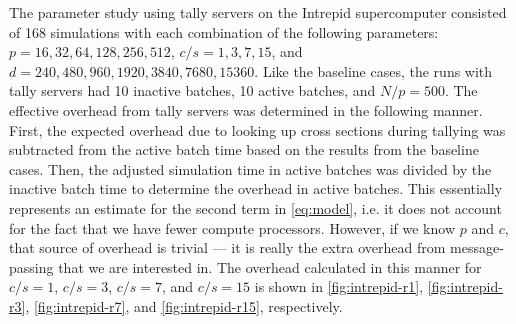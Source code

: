 The parameter study using tally servers on the Intrepid supercomputer consisted
of 168 simulations with each combination of the following parameters: $p =
16,32,64,128,256,512$, $c/s = 1,3,7,15$, and $d = 240, 480, 960, \allowbreak
1920, 3840, 7680, 15360$. Like the baseline cases, the runs with tally servers
had 10 inactive batches, 10 active batches, and $N/p = 500$. The effective
overhead from tally servers was determined in the following manner. First, the
expected overhead due to looking up cross sections during tallying was
subtracted from the active batch time based on the results from the baseline
cases. Then, the adjusted simulation time in active batches was divided by the
inactive batch time to determine the overhead in active batches. This
essentially represents an estimate for the second term in \eqref{eq:model},
i.e. it does not account for the fact that we have fewer compute
processors. However, if we know $p$ and $c$, that source of overhead is trivial
--- it is really the extra overhead from message-passing that we are interested
in. The overhead calculated in this manner for $c/s = 1$, $c/s = 3$, $c/s = 7$,
and $c/s = 15$ is shown in \autoref{fig:intrepid-r1}, \autoref{fig:intrepid-r3},
\autoref{fig:intrepid-r7}, and \autoref{fig:intrepid-r15}, respectively.


